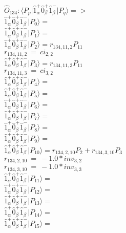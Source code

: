\documentclass[14pt]{article}
\begin{document}
    $\hat{O}_{134}:  \langle{P_p}\vert \hat{1}_{\alpha}^{+}\hat{0}_{\beta}^{+}\hat{1}_{\beta}^{-} \vert{P_q}\rangle => $ \\ 
    $ \hat{1}_{\alpha}^{+}\hat{0}_{\beta}^{+}\hat{1}_{\beta}^{-} \vert{P_{0}}\rangle =  $ \\ 
    $ \hat{1}_{\alpha}^{+}\hat{0}_{\beta}^{+}\hat{1}_{\beta}^{-} \vert{P_{1}}\rangle =  $ \\ 
    $ \hat{1}_{\alpha}^{+}\hat{0}_{\beta}^{+}\hat{1}_{\beta}^{-} \vert{P_{2}}\rangle = {r}_{134,11,2}P_{11} $ \\ 
    ${r}_{134,11,2}\ =\ {ci}_{2,2} $ \\ 
    $ \hat{1}_{\alpha}^{+}\hat{0}_{\beta}^{+}\hat{1}_{\beta}^{-} \vert{P_{3}}\rangle = {r}_{134,11,3}P_{11} $ \\ 
    ${r}_{134,11,3}\ =\ {ci}_{3,2} $ \\ 
    $ \hat{1}_{\alpha}^{+}\hat{0}_{\beta}^{+}\hat{1}_{\beta}^{-} \vert{P_{4}}\rangle =  $ \\ 
    $ \hat{1}_{\alpha}^{+}\hat{0}_{\beta}^{+}\hat{1}_{\beta}^{-} \vert{P_{5}}\rangle =  $ \\ 
    $ \hat{1}_{\alpha}^{+}\hat{0}_{\beta}^{+}\hat{1}_{\beta}^{-} \vert{P_{6}}\rangle =  $ \\ 
    $ \hat{1}_{\alpha}^{+}\hat{0}_{\beta}^{+}\hat{1}_{\beta}^{-} \vert{P_{7}}\rangle =  $ \\ 
    $ \hat{1}_{\alpha}^{+}\hat{0}_{\beta}^{+}\hat{1}_{\beta}^{-} \vert{P_{8}}\rangle =  $ \\ 
    $ \hat{1}_{\alpha}^{+}\hat{0}_{\beta}^{+}\hat{1}_{\beta}^{-} \vert{P_{9}}\rangle =  $ \\ 
    $ \hat{1}_{\alpha}^{+}\hat{0}_{\beta}^{+}\hat{1}_{\beta}^{-} \vert{P_{10}}\rangle = {r}_{134,2,10}P_{2}+{r}_{134,3,10}P_{3} $ \\ 
    ${r}_{134,2,10}\ =\ -1.0*{inv}_{3,2} $ \\ 
    ${r}_{134,3,10}\ =\ -1.0*{inv}_{3,3} $ \\ 
    $ \hat{1}_{\alpha}^{+}\hat{0}_{\beta}^{+}\hat{1}_{\beta}^{-} \vert{P_{11}}\rangle =  $ \\ 
    $ \hat{1}_{\alpha}^{+}\hat{0}_{\beta}^{+}\hat{1}_{\beta}^{-} \vert{P_{12}}\rangle =  $ \\ 
    $ \hat{1}_{\alpha}^{+}\hat{0}_{\beta}^{+}\hat{1}_{\beta}^{-} \vert{P_{13}}\rangle =  $ \\ 
    $ \hat{1}_{\alpha}^{+}\hat{0}_{\beta}^{+}\hat{1}_{\beta}^{-} \vert{P_{14}}\rangle =  $ \\ 
    $ \hat{1}_{\alpha}^{+}\hat{0}_{\beta}^{+}\hat{1}_{\beta}^{-} \vert{P_{15}}\rangle =  $ \\ 
    
\end{document}
